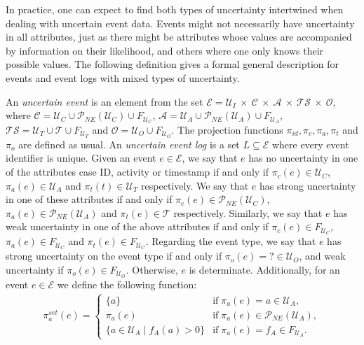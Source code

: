 In practice, one can expect to find both types of uncertainty intertwined when dealing with uncertain event data.
Events might not necessarily have uncertainty in all attributes, just as there might be attributes whose values are accompanied by information on their likelihood, and others where one only knows their possible values.
The following definition gives a formal general description for events and event logs with mixed types of uncertainty.
%
\begin{definition}
An \emph{uncertain event} is an element from the set
$\mathcal{E} = \mathcal{U}_I \: \times \:
\mathcal{C} \: \times \:
\mathcal{A} \: \times \:
\mathcal{TS} \: \times \:
\mathcal{O} $, where 
$
\mathcal{C} = \mathcal{U}_C \cup \mathcal{P}_{NE}(\mathcal{U}_C) \cup F_{\mathcal{U}_C}$, 
$\mathcal{A} = \mathcal{U}_A \cup \mathcal{P}_{NE}(\mathcal{U}_A) \cup F_{\mathcal{U}_A}$, 
$\mathcal{TS} = \mathcal{U}_T \cup \mathcal{T} \cup F_{\mathcal{U}_T}$ 
 and 
$\mathcal{O} = \mathcal{U}_O \cup F_{\mathcal{U}_O}$.
The projection functions $\pi_{id}, \pi_c, \pi_a, \pi_t$ and $\pi_o$ are defined as usual.
An \emph{uncertain event log} is a set $L \subseteq \mathcal{E}$ where every event identifier is unique.
Given an event $e \in \mathcal{E}$, we say that $e$ has no uncertainty in one of the attributes case ID, activity or timestamp if and only if $\pi_c(e) \in \mathcal{U}_C$, $\pi_a(e) \in \mathcal{U}_A$ and $\pi_t(t) \in \mathcal{U}_T$ respectively.
We say that $e$ has strong uncertainty in one of these attributes if and only if $\pi_c(e) \in \mathcal{P}_{NE}(\mathcal{U}_C)$, $\pi_a(e) \in \mathcal{P}_{NE}(\mathcal{U}_A)$ and $\pi_t(e) \in \mathcal{T}$ respectively.
Similarly, we say that $e$ has weak uncertainty in one of the above attributes if and only if $\pi_c(e) \in F_{\mathcal{U}_C}$, $\pi_a(e) \in F_{\mathcal{U}_C}$ and $\pi_t(e) \in F_{\mathcal{U}_C}$.
Regarding the event type, we say that $e$ has strong uncertainty on the event type if and only if $\pi_o(e)=? \in \mathcal{U}_O$, and weak uncertainty if $\pi_o(e) \in F_{\mathcal{U}_O}$.
Otherwise, $e$ is determinate.
Additionally, for an event $e \in \mathcal{E}$ we define the following function: 
\begin{align*}
\pi_a^{set}(e) = \begin{cases}
	\{a\} & \mbox{if} \; \pi_a(e)=a \in \mathcal{U}_A, \\
	\pi_a(e) & \mbox{if} \; \pi_a(e) \in \mathcal{P}_{NE}(\mathcal{U}_A),\\
	\{a \in \mathcal{U}_A \mid f_A(a)>0 \} & \mbox{if} \; \pi_a(e) = f_A \in F_{\mathcal{U}_A}.
	\end{cases}
\end{align*}
\end{definition}

